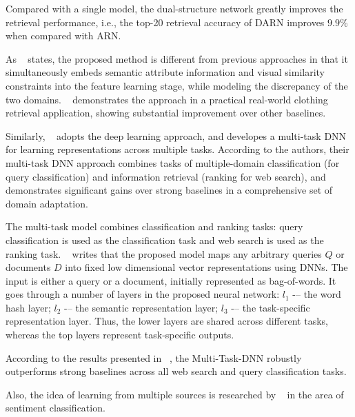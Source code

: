 Compared with a single model, the dual-structure network greatly improves the retrieval performance, i.e.,
the top-20 retrieval accuracy of DARN improves $9.9\%$ when compared with ARN.

As ~\citep{crossdomimage} states, the proposed method is different from previous approaches in that it simultaneously embeds semantic attribute information and visual similarity constraints into the feature learning stage, while modeling the discrepancy of the two domains. ~\citep{crossdomimage} demonstrates the approach in a practical real-world clothing retrieval application, showing substantial improvement over other baselines. 

Similarly, ~\citep{multitaskdeep} adopts the deep learning approach, and developes a multi-task DNN for learning representations across multiple tasks. According to the authors, their multi-task DNN approach combines tasks of multiple-domain classification (for query classification) and information retrieval (ranking for web search), and demonstrates significant gains over strong baselines in a comprehensive set of domain adaptation.

The multi-task model combines classification and ranking tasks: query classification is used as the classification task and web search is used as the ranking task. ~\citep{multitaskdeep} writes that the proposed model maps any arbitrary queries $Q$ or documents $D$ into fixed low dimensional vector representations using DNNs. The input is either a query or a document, initially represented as bag-of-words. It goes through a number of layers in the proposed neural network: $l_1$ -– the word hash layer; $l_2$ -– the semantic representation layer; $l_3$ -– the task-specific representation layer. 
Thus, the lower layers are shared across different tasks, whereas the top layers represent task-specific outputs. 

According to the results presented in ~\citep{multitaskdeep}, the Multi-Task-DNN robustly outperforms strong baselines across all web search and query classification tasks.

Also, the idea of learning from multiple sources is researched by ~\citep{sentmulti} in the area of sentiment classification. 

